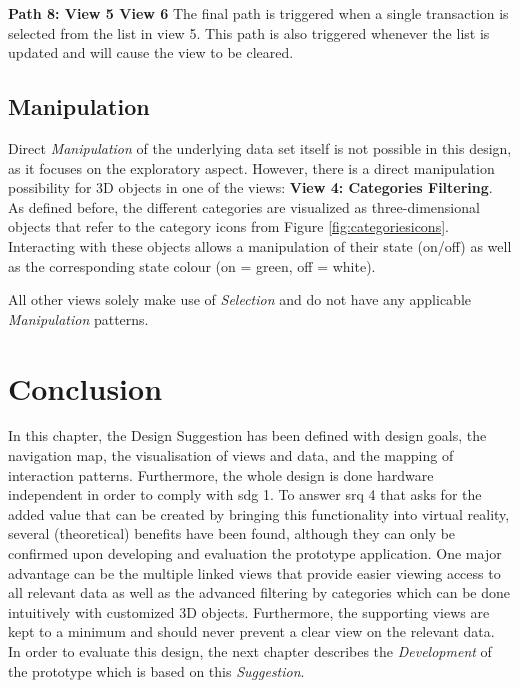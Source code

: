 \textbf{Path 8: View 5 \textrightarrow View 6} \newline
The final path is triggered when a single transaction is selected from the list in view 5. This path is also triggered whenever the list is updated and will cause the view to be cleared.




\subsection{Manipulation}

Direct \textit{Manipulation} of the underlying data set itself is not possible in this design, as it focuses on the exploratory aspect. However, there is a direct manipulation possibility for 3D objects in one of the views: \textbf{View 4: Categories Filtering}. As defined before, the different categories are visualized as three-dimensional objects that refer to the category icons from Figure \ref{fig:categoriesicons}. Interacting with these objects allows a manipulation of their state (on/off) as well as the corresponding state colour (on = green, off = white).

All other views solely make use of \textit{Selection} and do not have any applicable \textit{Manipulation} patterns.



\section{Conclusion}

In this chapter, the Design Suggestion has been defined with design goals, the navigation map, the visualisation of views and data, and the mapping of interaction patterns. Furthermore, the whole design is done hardware independent in order to comply with \gls{sdg} 1. To answer \gls{srq} 4 that asks for the added value that can be created by bringing this functionality into virtual reality, several (theoretical) benefits have been found, although they can only be confirmed upon developing and evaluation the prototype application. One major advantage can be the multiple linked views that provide easier viewing access to all relevant data as well as the advanced filtering by categories which can be done intuitively with customized 3D objects. Furthermore, the supporting views are kept to a minimum and should never prevent a clear view on the relevant data. \newline
In order to evaluate this design, the next chapter describes the \textit{Development} of the prototype which is based on this \textit{Suggestion}.
